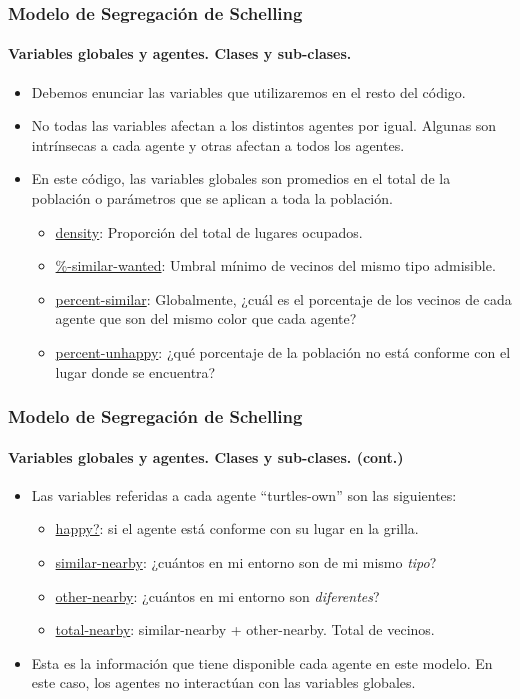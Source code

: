 \documentclass[11pt]{beamer}
\begin{document}
\begin{frame}
	\frametitle{Modelo de Segregación de Schelling}
\framesubtitle{Variables globales y agentes. Clases y sub-clases.}
\begin{itemize}
	\item Debemos enunciar las variables que utilizaremos en el resto del código.
	\item No todas las variables afectan a los distintos agentes por igual. Algunas son intrínsecas a cada agente y otras afectan a todos los agentes.
	\item En este código, las variables globales son promedios en el total de la población o parámetros que se aplican a toda la población.
	\begin{itemize}
		\item \underline{density}: Proporción del total de lugares ocupados.
		\item \underline{\%-similar-wanted}: Umbral mínimo de vecinos del mismo tipo admisible.
		\item \underline{percent-similar}: Globalmente, ¿cuál es el porcentaje de los vecinos de cada agente que son del mismo color que cada agente? 
		\item \underline{percent-unhappy}: ¿qué porcentaje de la población no está conforme con el lugar donde se encuentra?
	\end{itemize}
\end{itemize}
\end{frame}

\begin{frame}
	\frametitle{Modelo de Segregación de Schelling}
	\framesubtitle{Variables globales y agentes. Clases y sub-clases. (cont.)}
	\begin{itemize}
		\item Las variables referidas a cada agente ``turtles-own'' son las siguientes:
		\begin{itemize}
			\item \underline{happy?}: si el agente está conforme con su lugar en la grilla. 
			\item \underline{similar-nearby}: ¿cuántos en mi entorno son de mi mismo \textit{tipo}?
			\item \underline{other-nearby}: ¿cuántos en mi entorno son \textit{diferentes}?
			\item \underline{total-nearby}: similar-nearby + other-nearby. Total de vecinos.
		\end{itemize}
	\item Esta es la información que tiene disponible cada agente en este modelo. En este caso, los agentes no interactúan con las variables globales.
	\end{itemize}
\end{frame}
\end{document}
